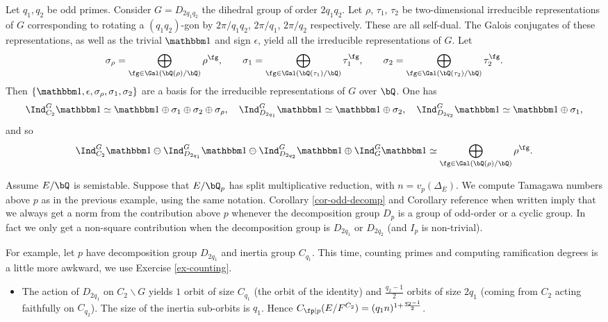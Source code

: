 \begin{example}[Dihedral]
    Let $q_1, q_2$ be odd primes. Consider $G = D_{2 q_1 q_2}$ the dihedral group of order $2 q_1 q_2$. 
    Let $\rho$, $\tau_1$, $\tau_2$ be two-dimensional irreducible representations of $G$ corresponding to rotating a $(q_1 q_2)$-gon by $2 \pi / q_1 q_2$, $2 \pi / q_1$, $2 \pi/ q_2$ respectively. These are all self-dual. The Galois conjugates of these representations, as well as the trivial $\trivial$ and sign $\epsilon$, yield all the irreducible representations of $G$. Let 
    \[  \sigma_{\rho} = \bigoplus_{ \fg \in \Gal(\bQ(\rho) / \bQ)} \rho^{\fg}, \qquad
        \sigma_1 = \bigoplus_{ \fg \in \Gal(\bQ(\tau_1) / \bQ)} \tau_1^{\fg}, \qquad
        \sigma_2 = \bigoplus_{ \fg \in \Gal(\bQ(\tau_2) / \bQ)} \tau_2^{\fg}. \]  
    Then $ \{ \trivial , \epsilon, \sigma_{\rho}, \sigma_1, \sigma_2 \}$ are a basis for the irreducible representations of $G$ over $\bQ$. 
    One has
\[
        \Ind_{C_2}^G \trivial \simeq \trivial \oplus \sigma_1 \oplus \sigma_2 \oplus \sigma_{\rho}, \quad
        \Ind_{D_{2 q_1}}^G \trivial \simeq \trivial \oplus \sigma_2, \quad
        \Ind_{D_{2 q_2}}^G \trivial \simeq \trivial \oplus \sigma_1,
\]
and so 
\begin{equation*}
\Ind_{C_2}^G \trivial \ominus \Ind_{D_{2 q_1}}^G \trivial \ominus \Ind_{D_{2 q_2}}^G \trivial \oplus \Ind_{G}^G \trivial \simeq \bigoplus_{ \fg \in \Gal(\bQ(\rho) / \bQ)} \rho^{\fg}.
\end{equation*}

    Assume $E / \bQ$ is semistable. Suppose that $E / \bQ_p$ has split multiplicative reduction, with $n = v_p(\Delta_E)$. We compute Tamagawa numbers above $p$ as in the previous example, using the same notation. 
    Corollary \ref{cor-odd-decomp} and Corollary {\color{red} reference when written} imply that we always get a norm from the contribution above $p$ whenever the decomposition group $D_p$ is a group of odd-order or a cyclic group. In fact we only get a non-square contribution when the decomposition group is $D_{2 q_1}$ or $D_{2 q_2}$ (and $I_p$ is non-trivial). 
     
    For example, let $p$ have decomposition group $D_{2 q_1}$ and inertia group $C_{q_1}$.
    This time, counting primes and computing ramification degrees is a little more awkward, we use Exercise \ref{ex-counting}.
        \begin{itemize}[--]
            \setlength\itemsep{0em}
            \item The action of $D_{2 q_1}$ on $C_2 \backslash G$ yields $1$ orbit of size $C_{q_1}$ (the orbit of the identity) and $\frac{q_2 - 1}{2}$ orbits of size $2q_1$ (coming from $C_2$ acting faithfully on $C_{q_2}$). The size of the inertia sub-orbits is $q_1$. Hence $C_{\fp \mid p}(E / F^{C_2}) = (q_1 n)^{1 + \frac{q_2 - 1}{2}}$.
            

\end{itemize}
\end{example}
